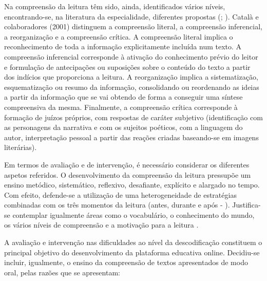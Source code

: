 \documentclass[
  oneside,
  11pt, a4paper,
  footinclude=true,
  headinclude=true,
  cleardoublepage=empty
]{scrbook}
\begin{document}
Na compreensão da leitura têm sido, ainda, identificados vários níveis, encontrando-se, na literatura da especialidade, diferentes propostas (\citealp{Catala}; \citealp{Giasson}). Català e colaboradores (2001) distinguem a compreensão literal, a compreensão inferencial, a reorganização e a compreensão crítica. A compreensão literal implica o reconhecimento de toda a informação explicitamente incluída num texto. A compreensão inferencial corresponde à ativação do conhecimento prévio do leitor e formulação de antecipações ou suposições sobre o conteúdo do texto a partir dos indícios que proporciona a leitura. A reorganização implica a sistematização, esquematização ou resumo da informação, consolidando ou reordenando as ideias a partir da informação que se vai obtendo de forma a conseguir uma síntese compreensiva da mesma. Finalmente, a compreensão crítica corresponde à formação de juízos próprios, com respostas de caráter subjetivo (identificação com as personagens da narrativa e com os sujeitos poéticos, com a linguagem do autor, interpretação pessoal a partir das reações criadas baseando-se em imagens literárias).

Em termos de avaliação e de intervenção, é necessário considerar os diferentes aspetos referidos. O desenvolvimento da compreensão da leitura pressupõe um ensino metódico, sistemático, reflexivo, desafiante, explícito e alargado no tempo. Com efeito, defende-se a utilização de uma heterogeneidade de estratégias combinadas com os três momentos da leitura (antes, durante e após - \citep{Giasson}). Justifica-se contemplar igualmente áreas como o vocabulário, o conhecimento do mundo, os vários níveis de compreensão e a motivação para a leitura \citep{RibeiroViana2010}.

A avaliação e intervenção nas dificuldades ao nível da descodificação constituem o principal objetivo do desenvolvimento da plataforma educativa online. Decidiu-se incluir, igualmente, o ensino da compreensão de textos apresentados de modo oral, pelas razões que se apresentam:
\end{document}
